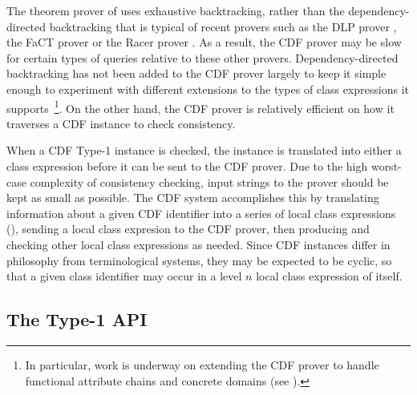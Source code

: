 The theorem prover of \version{} uses exhaustive backtracking, rather
than the dependency-directed backtracking that is typical of recent
provers such as the DLP prover \cite{}, the FaCT prover \cite{} or the
Racer prover \cite{}.  As a result, the CDF prover may be slow for
certain types of queries relative to these other provers.
Dependency-directed backtracking has not been added to the CDF prover
largely to keep it simple enough to experiment with different
extensions to the types of class expressions it supports~\footnote{In
particular, work is underway on extending the CDF prover to handle
functional attribute chains and concrete domains (see \cite{}).}.  On
the other hand, the CDF prover is relatively efficient on how it
traverses a CDF instance to check consistency.

When a CDF Type-1 instance is checked, the instance is translated into
either a class expression before it can be sent to the CDF prover.
Due to the high worst-case complexity of consistency checking, input
strings to the prover should be kept as small as possible.  The CDF
system accomplishes this by translating information about a given CDF
identifier into a series of local class expressions
(), sending a local class expresion to the CDF prover,
then producing and checking other local class expressions as needed.
Since CDF instances differ in philosophy from terminological systems,
they may be expected to be cyclic, so that a given class identifier
may occur in a level $n$ local class expression of itself.

\subsection{The Type-1 API}

